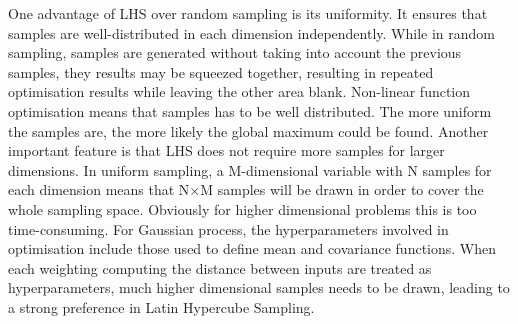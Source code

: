 \documentclass[14pt]{report}
\numberwithin{equation}{chapter}
\begin{document}
\begin{spacing}{2}
One advantage of LHS over random sampling is its uniformity. It ensures that samples are well-distributed in each dimension independently. While in random sampling, samples are generated without taking into account the previous samples, they results may be squeezed together, resulting in repeated optimisation results while leaving the other area blank. Non-linear function optimisation means that samples has to be well distributed. The more uniform the samples are, the more likely the global maximum could be found. Another important feature is that LHS does not require more samples for larger dimensions. In uniform sampling, a M-dimensional variable with N samples for each dimension means that N$\times$M samples will be drawn in order to cover the whole sampling space. Obviously for higher dimensional problems this is too time-consuming. For Gaussian process, the hyperparameters involved in optimisation include those used to define mean and covariance functions. When each weighting computing the distance between inputs are treated as hyperparameters, much higher dimensional samples needs to be drawn, leading to a strong preference in Latin Hypercube Sampling.  


\end{spacing}
\end{document}
